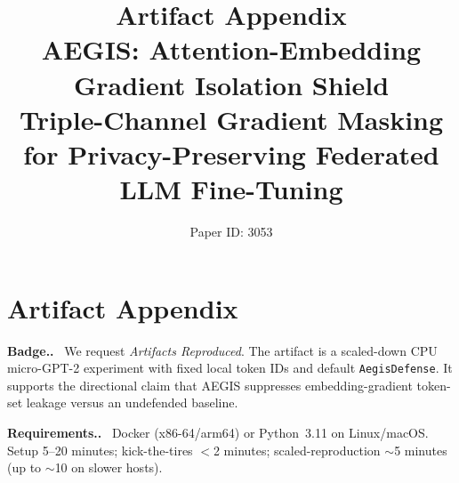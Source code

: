 \documentclass[11pt]{article}
\newcommand{\paragraph}[1]{\smallskip\noindent\textbf{#1.}\ }%
\begin{document}
\title{%
  \textbf{\LARGE Artifact Appendix}\\[0.5em]
  \large AEGIS: Attention-Embedding Gradient Isolation Shield\\
  \large Triple-Channel Gradient Masking for Privacy-Preserving Federated LLM Fine-Tuning
}
\author{Paper ID: 3053}
\date{}
\maketitle

\section{Artifact Appendix}
\label{app:artifact}

\paragraph{Badge.}
We request \emph{Artifacts Reproduced}. The artifact is a scaled-down CPU micro-GPT-2
experiment with fixed local token IDs and default \texttt{AegisDefense}. It supports the
directional claim that AEGIS suppresses embedding-gradient token-set leakage versus an
undefended baseline.

\paragraph{Requirements.}
Docker (x86-64/arm64) or
Python~3.11 on Linux/macOS. Setup 5--20 minutes; kick-the-tires $<$2 minutes;
scaled-reproduction $\sim$5 minutes (up to $\sim$10 on slower hosts).
\end{document}
